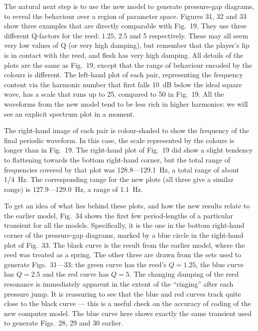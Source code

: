 
  The natural next step is to use the new model to generate pressure-gap 
  diagrams, to reveal the behaviour over a region of parameter space. Figures 
  31, 32 and 33 show three examples that are directly comparable with Fig.\ 19. 
  They use three different Q-factors for the reed: 1.25, 2.5 and 5 
  respectively. These may all seem very low values of Q (or very high damping), 
  but remember that the player's lip is in contact with the reed, and flesh has 
  very high damping. All details of the plots are the same as Fig.\ 19, except 
  that the range of behaviour encoded by the colours is different. The 
  left-hand plot of each pair, representing the frequency content via the 
  harmonic number that first falls 10~dB below the ideal square wave, has a 
  scale that runs up to 25, compared to 50 in Fig.\ 19. All the waveforms from 
  the new model tend to be less rich in higher harmonics: we will see an 
  explicit spectrum plot in a moment. 







  The right-hand image of each pair is colour-shaded to show the frequency of 
  the final periodic waveform. In this case, the scale represented by the 
  colours is longer than in Fig.\ 19. The right-hand plot of Fig.\ 19 did show 
  a slight tendency to flattening towards the bottom right-hand corner, but the 
  total range of frequencies covered by that plot was 128.8—129.1~Hz, a total 
  range of about 1/4~Hz. The corresponding range for the new plots (all three 
  give a similar range) is 127.9—129.0~Hz, a range of 1.1~Hz. 

  To get an idea of what lies behind these plots, and how the new results 
  relate to the earlier model, Fig.\ 34 shows the first few period-lengths of a 
  particular transient for all the models. Specifically, it is the one in the 
  bottom right-hand corner of the pressure-gap diagrams, marked by a blue 
  circle in the right-hand plot of Fig.\ 33. The black curve is the result from 
  the earlier model, where the reed was treated as a spring. The other three 
  are drawn from the sets used to generate Figs.\ 31—33: the green curve has 
  the reed’s $Q=1.25$, the blue curve has $Q=2.5$ and the red curve has $Q=5$. 
  The changing damping of the reed resonance is immediately apparent in the 
  extent of the “ringing” after each pressure jump. It is reassuring to see 
  that the blue and red curves track quite close to the black curve --- this is 
  a useful check on the accuracy of coding of the new computer model. The blue 
  curve here shows exactly the same transient used to generate Figs.\ 28, 29 
  and 30 earlier. 

